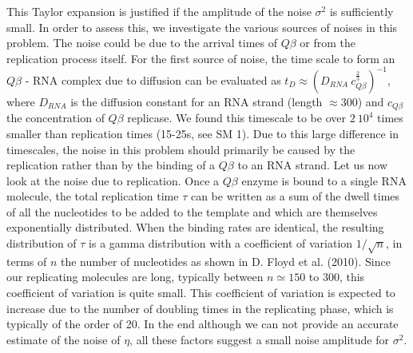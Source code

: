 \documentclass[twocolumn,showpacs,floatfix]{revtex4-1}
\begin{document}
\begin{thebibliography}{99}
\begin{widetext}
This Taylor expansion is justified if the amplitude of the noise $\sigma^2$
is sufficiently small. 
In order to assess this, we investigate the various sources of noises in this problem.
The noise could be due to the arrival times of $Q\beta$ or
from the replication process itself.
For the first source of noise, the time scale to form an $Q \beta$ - RNA complex 
due to diffusion can be evaluated as  
 $ t_D \approx (D_{RNA} \ c_{Q\beta}^{\frac{2}{3}})^{-1}$, 
where $D_{RNA}$ is the diffusion constant for an RNA strand (length $\approx 300$) and $c_{Q \beta}$ the concentration of $Q \beta$ replicase. 
We found this timescale to be over $2 \ 10^4$ times smaller than replication times (15-25s, see SM 1). 
Due to this large difference in timescales, the noise in this problem should primarily be caused 
by the replication rather than by the binding of a $Q\beta$ to an RNA strand.
Let us now look at the noise due to replication.
Once a $Q \beta$ enzyme is bound to a single RNA molecule, the total replication time $\tau$
can be written as a sum of the dwell times of all the nucleotides to be added to the template and 
which are themselves exponentially distributed. When the binding rates are identical, the resulting
distribution of $\tau$ is a gamma distribution with a coefficient of variation $1/\sqrt{n}$, in terms
of $n$ the number of nucleotides as shown in D. Floyd et al. (2010). 
Since our replicating molecules are long, typically between $n\simeq 150$ to $300$, 
this coefficient of variation is quite small.
This coefficient of variation is expected to increase due to the number of doubling times 
in the replicating phase, which is typically of the order of 20. 
In the end although we can not provide an accurate estimate
of the noise of $\eta$, all these factors suggest a small noise amplitude for $\sigma^2$.


\end{widetext}
\end{thebibliography}
\end{document}
